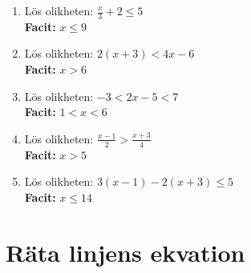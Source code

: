 \documentclass[a4paper,11pt]{article}
\begin{document}
\begin{enumerate}[label=\textbf{\arabic*.}]
    \item Lös olikheten: $\frac{x}{3} + 2 \leq 5$
    \\ \textbf{Facit:} $x \leq 9$
    
    \item Lös olikheten: $2(x + 3) < 4x - 6$
    \\ \textbf{Facit:} $x > 6$
    
    \item Lös olikheten: $-3 < 2x - 5 < 7$
    \\ \textbf{Facit:} $1 < x < 6$
    
    \item Lös olikheten: $\frac{x-1}{2} > \frac{x+3}{4}$
    \\ \textbf{Facit:} $x > 5$
    
    \item Lös olikheten: $3(x - 1) - 2(x + 3) \leq 5$
    \\ \textbf{Facit:} $x \leq 14$
\end{enumerate}


\newpage
\section*{Räta linjens ekvation}
\end{document}
